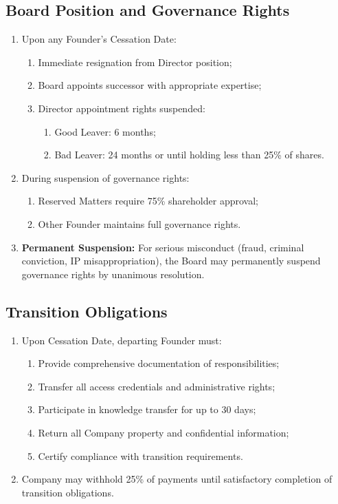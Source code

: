 \subsection{Board Position and Governance Rights}
\begin{enumerate}[label=(\alph*)]
\item Upon any Founder's Cessation Date:
    \begin{enumerate}[label=(\roman*)]
    \item Immediate resignation from Director position;
    \item Board appoints successor with appropriate expertise;
    \item Director appointment rights suspended:
        \begin{enumerate}[label=(\alph*)]
        \item Good Leaver: 6 months;
        \item Bad Leaver: 24 months or until holding less than 25\% of shares.
        \end{enumerate}
    \end{enumerate}

\item During suspension of governance rights:
    \begin{enumerate}[label=(\roman*)]
    \item Reserved Matters require 75\% shareholder approval;
    \item Other Founder maintains full governance rights.
    \end{enumerate}

\item \textbf{Permanent Suspension:} For serious misconduct (fraud, criminal conviction, IP misappropriation), the Board may permanently suspend governance rights by unanimous resolution.
\end{enumerate}

\subsection{Transition Obligations}
\begin{enumerate}[label=(\alph*)]
\item Upon Cessation Date, departing Founder must:
    \begin{enumerate}[label=(\roman*)]
    \item Provide comprehensive documentation of responsibilities;
    \item Transfer all access credentials and administrative rights;
    \item Participate in knowledge transfer for up to 30 days;
    \item Return all Company property and confidential information;
    \item Certify compliance with transition requirements.
    \end{enumerate}

\item Company may withhold 25\% of payments until satisfactory completion of transition obligations.
\end{enumerate}

